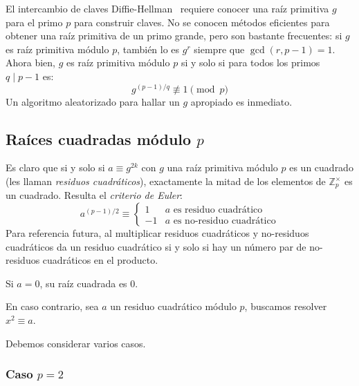   El intercambio de claves Diffie-Hellman~%
    \cite{diffie76:_new_directions_cryptography}
  requiere conocer una raíz primitiva \(g\) para el primo \(p\)
  para construir claves.
  No se conocen métodos eficientes para obtener una raíz primitiva
  de un primo grande,
  pero son bastante frecuentes:
  si \(g\) es raíz primitiva módulo \(p\),
  también lo es \(g^r\) siempre que \(\gcd(r, p - 1) = 1\).
  Ahora bien,
  \(g\) es raíz primitiva módulo \(p\)
  si y solo si para todos los primos \(q \mid p - 1\) es:
  \begin{equation*}
    g^{(p - 1) / q}
      \not\equiv 1 \pmod{p}
  \end{equation*}
  Un algoritmo aleatorizado para hallar un \(g\) apropiado es inmediato.

\subsection{Raíces cuadradas módulo \(p\)}
\label{sec:sqrt-mod-p}

  Es claro que si y solo si \(a \equiv g^{2 k}\)
  con \(g\) una raíz primitiva módulo \(p\)
  es un cuadrado
  (les llaman \emph{residuos cuadráticos}),
  exactamente la mitad de los elementos de \(\mathbb{Z}_p^\times\)
  es un cuadrado.
  Resulta el \emph{criterio de Euler}:
  \begin{equation}
    \label{eq:Euler-criterion}
    a^{(p - 1) / 2}
      \equiv \begin{cases}
                1 & \text{\(a\) es residuo cuadrático} \\
               -1 & \text{\(a\) es no-residuo cuadrático}
             \end{cases}
  \end{equation}
  Para referencia futura,
  al multiplicar residuos cuadráticos y no\nobreakdash-residuos cuadráticos
  da un residuo cuadrático
  si y solo si hay un número par de no\nobreakdash-residuos cuadráticos
  en el producto.

  Si \(a = 0\),
  su raíz cuadrada es \num{0}.

  En caso contrario,
  sea \(a\) un residuo cuadrático módulo \(p\),
  buscamos resolver \(x^2 \equiv a\).

  Debemos considerar varios casos.

\subsubsection{Caso \(p = 2\)}
\label{sec:p=2}

